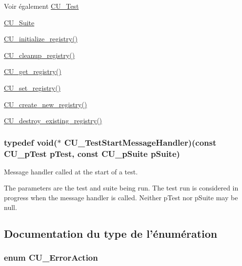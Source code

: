 \begin{DoxySeeAlso}{Voir également}
\hyperlink{structCU__Test}{C\-U\-\_\-\-Test} 

\hyperlink{structCU__Suite}{C\-U\-\_\-\-Suite} 

\hyperlink{group__Framework_ga3477b2d3e57c8f8aba36bbbdfa54920d}{C\-U\-\_\-initialize\-\_\-registry()} 

\hyperlink{group__Framework_ga183eb7d7f79e149c767237cfef52cb82}{C\-U\-\_\-cleanup\-\_\-registry()} 

\hyperlink{group__Framework_gacdc4bab7b0492ed1e3a4e076677de22e}{C\-U\-\_\-get\-\_\-registry()} 

\hyperlink{group__Framework_gaaec6d8893d61bfff165775385851562d}{C\-U\-\_\-set\-\_\-registry()} 

\hyperlink{group__Framework_ga5d2ce564b228122842f515cb4e5beda2}{C\-U\-\_\-create\-\_\-new\-\_\-registry()} 

\hyperlink{group__Framework_ga7c46b0ae888482411575c93d5d780b0d}{C\-U\-\_\-destroy\-\_\-existing\-\_\-registry()} 
\end{DoxySeeAlso}
\hypertarget{group__Framework_ga3330df7f5c95933f4ba21c648933c928}{
\subsubsection[{C\-U\-\_\-\-Test\-Start\-Message\-Handler}]{\setlength{\rightskip}{0pt plus 5cm}typedef void($\ast$ C\-U\-\_\-\-Test\-Start\-Message\-Handler)(const {\bf C\-U\-\_\-p\-Test} p\-Test, const {\bf C\-U\-\_\-p\-Suite} p\-Suite)}}\label{group__Framework_ga3330df7f5c95933f4ba21c648933c928}


Message handler called at the start of a test. 

The parameters are the test and suite being run. The test run is considered in progress when the message handler is called. Neither p\-Test nor p\-Suite may be null. 

\subsection{Documentation du type de l'énumération}
\hypertarget{group__Framework_ga50053b4edbfc96a88027dd57c580ca35}{
\subsubsection[{C\-U\-\_\-\-Error\-Action}]{\setlength{\rightskip}{0pt plus 5cm}enum {\bf C\-U\-\_\-\-Error\-Action}}}\label{group__Framework_ga50053b4edbfc96a88027dd57c580ca35}


